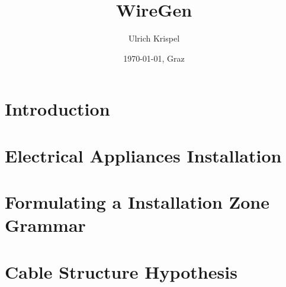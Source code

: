 \documentclass[12pt]{scrartcl}
\title{WireGen}
\author{Ulrich Krispel}
\date{\today{}, Graz}
\begin{document}
 
\maketitle

\section{Introduction}

\section{Electrical Appliances Installation}

\section{Formulating a Installation Zone Grammar}

\section{Cable Structure Hypothesis}


 
\end{document}
